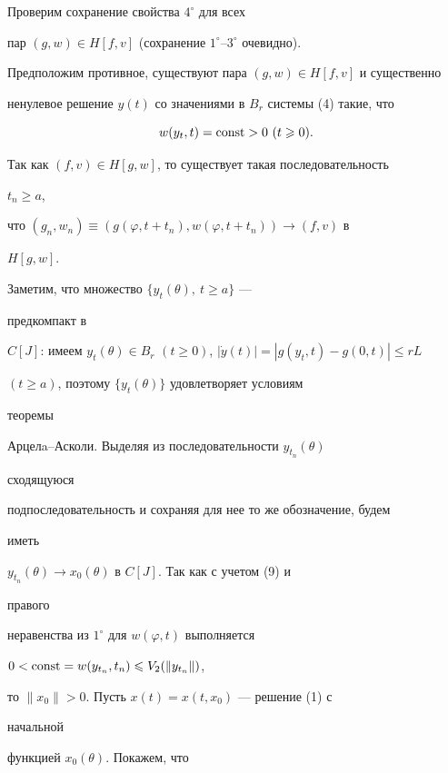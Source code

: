 \begin{pf}


Проверим сохранение свойства $4^{\circ}$ для всех


пар $(g,w)\in H[f,v]$ (сохранение $1^{\circ}$--$3^{\circ}$ очевидно).


Предположим противное, существуют пара $(g,w)\in H[f,v]$ и существенно


ненулевое решение $y(t)$ со значениями в $B_r$ системы (4) такие, что


\begin{equation}


w(y_t,t)=\const>0\ (t\geqslant 0).


\end{equation}


Так как $(f,v)\in H[g,w]$, то существует такая последовательность


$t_n\geqslant a$,


что $(g_n,w_n)\equiv (g(\varphi,t+t_n),w(\varphi,t+t_n))\to (f,v)$ в


$H[g,w]$.


Заметим, что множество $\{y_t(\theta),\ t\geqslant a\}$ ---


предкомпакт в


$C[J]$: имеем $y_t(\theta)\in B_r$ $(t\geqslant 0)$, $|\Dot


y(t)|=| g(y_t,t)-g(0,t)|\leqslant rL$


$(t\geqslant a)$, поэтому $\{y_t(\theta)\}$ удовлетворяет условиям


теоремы


Арцелa--Асколи. Выделяя из последовательности $y_{t_n}(\theta)$


сходящуюся


подпоследовательность и сохраняя для нее то же обозначение, будем


иметь


$y_{t_n}(\theta)\to x_0(\theta)$ в $C[J]$. Так как с учетом (9) и


правого


неравенства из $1^{\circ}$ для $w(\varphi,t)$ выполняется


$0< \operatorname{const}=w(y_{t_n},t_n)\leqslant V_2(\| y_{t_n}\|)$,


то $\| x_0\| >0$. Пусть $x(t)=x(t,x_0)$ --- решение (1) с


начальной


функцией $x_0(\theta)$. Покажем, что


\begin{equation}



\end{equation}
\end{pf}
